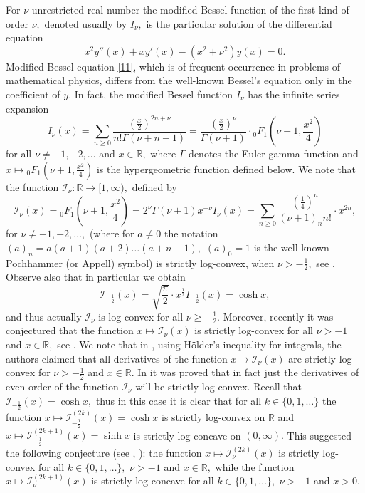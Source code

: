 \documentclass[10pt]{amsart}
\begin{document}
For $\nu$ unrestricted real number the modified Bessel function of
the first kind of order $\nu,$ denoted usually by $I_{\nu},$ is the
particular solution of the differential equation \cite[p.
77]{watson}
\begin{equation}\label{11}
x^2y''(x)+xy'(x)-(x^2+\nu^2)y(x)=0.
\end{equation}
Modified Bessel equation \eqref{11}, which is of frequent occurrence in problems
of mathematical physics, differs from the well-known Bessel's
equation only in the coefficient of $y.$ In fact, the modified
Bessel function $I_{\nu}$ has the infinite series expansion \cite[p.
77]{watson}
\begin{equation}\label{12}
I_{\nu}(x)=\sum_{n\geq
0}\frac{{\left(\frac{x}{2}\right)}^{2n+\nu}}{n!\Gamma(\nu+n+1)}
=\frac{\left(\frac{x}{2}\right)^{\nu}}{\Gamma(\nu+1)}\cdot{}_0F_1\left(\nu+1,\frac{x^2}{4}\right)
\end{equation}
for all $\nu\neq -1,-2,\dots$ and $x\in\mathbb{R},$ where $\Gamma$
denotes the Euler gamma function and
$x\mapsto{}_0F_1\left(\nu+1,\frac{x^2}{4}\right)$ is the hypergeometric function
defined below. We note that the function
$\mathcal{I}_{\nu}:\mathbb{R}\rightarrow[1,\infty),$ defined by
\begin{equation}\label{13}\mathcal{I}_{\nu}(x)={}_0F_1\left(\nu+1,\frac{x^2}{4}\right)=2^{\nu}\Gamma(\nu+1)x^{-\nu}I_{\nu}(x)=
\sum_{n\geq 0}\frac{\left(\frac{1}{4}\right)^n}{{(\nu+1)}_nn!}\cdot
x^{2n},\end{equation} for $\nu\neq -1,-2,\dots,$ (where for $a\neq
0$ the notation ${(a)}_n=a(a+1)(a+2)\dots(a+n-1),$ ${(a)}_0=1$ is
the well-known Pochhammer (or Appell) symbol) is strictly
log-convex, when $\nu>-\frac{1}{2},$ see \cite{neuman}. Observe also that in particular we obtain
$$\mathcal{I}_{-\frac{1}{2}}(x)=\sqrt{\frac{\pi}{2}}\cdot x^{\frac{1}{2}}I_{-\frac{1}{2}}(x)=\cosh
x,$$ and thus actually $\mathcal{I}_{\nu}$ is log-convex for all $\nu\geq
-\frac{1}{2}.$ Moreover, recently it was conjectured that the function $x \mapsto \mathcal{I}_{\nu}(x)$
is strictly log-convex for all $\nu> -1$ and $x \in \mathbb{R},$ see \cite[p. 271]{bane1}. We note that in \cite{GLP},
using H\"older's inequality for integrals, the authors claimed that all
derivatives of the function ${x\mapsto\mathcal{I}_{\nu}(x)}$ are
strictly log-convex for $\nu>-\frac{1}{2}$ and $x\in\mathbb{R}.$ In \cite{MI} it was proved that in fact just the
derivatives of even order of the function $\mathcal{I}_{\nu}$
will be strictly log-convex. Recall that
$\mathcal{I}_{-\frac{1}{2}}(x)=\cosh x,$ thus in this case it is clear
that for all $k\in\{0,1,\dots\}$ the function
$x\mapsto\mathcal{I}^{(2k)}_{-\frac{1}{2}}(x)=\cosh x$ is strictly
log-convex on $\mathbb{R}$ and
$x\mapsto\mathcal{I}^{(2k+1)}_{-\frac{1}{2}}(x)=\sinh x$ is strictly
log-concave on $(0,\infty).$ This suggested the following conjecture (see \cite[p. 101]{bariczPhD}, \cite[p. 187]{barspringer}): the function
$x\mapsto\mathcal{I}^{(2k)}_{\nu}(x)$ is strictly log-convex for all
$k\in\{0,1,\dots\},$ $\nu>-1$ and $x\in\mathbb{R},$ while the function
$x\mapsto\mathcal{I}^{(2k+1)}_{\nu}(x)$ is strictly log-concave for
all $k\in\{0,1,\dots\},$ $\nu>-1$ and $x>0.$
\end{document}
